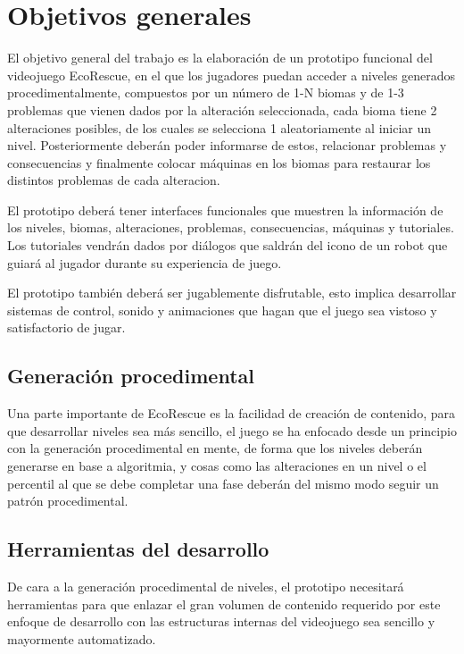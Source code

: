 \raggedbottom
\section{Objetivos generales}
El objetivo general del trabajo es la elaboración de un prototipo funcional del videojuego EcoRescue, 
en el que los jugadores puedan acceder a niveles generados procedimentalmente, compuestos por un número
de 1-N biomas y de 1-3 problemas que vienen dados por la alteración seleccionada, cada bioma tiene 2 
alteraciones posibles, de los cuales se selecciona 1 aleatoriamente al iniciar un nivel. 
Posteriormente deberán poder informarse de estos, relacionar problemas y consecuencias y finalmente 
colocar máquinas en los biomas para restaurar los distintos problemas de cada alteracion.

El prototipo deberá tener interfaces funcionales que muestren la información de los niveles, biomas, alteraciones, problemas, consecuencias, máquinas y tutoriales. Los tutoriales vendrán dados por diálogos que saldrán del 
icono de un robot que guiará al jugador durante su experiencia de juego.

El prototipo también deberá ser jugablemente disfrutable, esto implica desarrollar sistemas de control, sonido y animaciones que hagan que el juego sea vistoso y satisfactorio de jugar.

\subsection{Generación procedimental}

Una parte importante de EcoRescue es la facilidad de creación de contenido, para que desarrollar niveles sea más sencillo, el juego se ha enfocado desde un principio con la generación procedimental en mente, de forma que los niveles deberán generarse en base a algoritmia\cite{FastNoiseLite}, y cosas como las alteraciones en un nivel o el percentil al que se debe completar una fase deberán del mismo modo seguir un patrón procedimental.

\subsection{Herramientas del desarrollo}

De cara a la generación procedimental de niveles, el prototipo necesitará herramientas para que enlazar el gran volumen de contenido requerido por este enfoque de desarrollo con las estructuras internas del videojuego sea sencillo y mayormente automatizado. 

